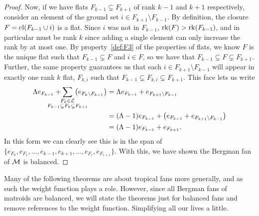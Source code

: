 \documentclass[12pt,oneside]{../../sfsuthesis}
\begin{document}
\begin{proof}
    Now, if we have flats \( F_{k-1} \subsetneq F_{k+1} \) of rank \( k-1 \) and \( k+1 \) respectively, consider an element of the ground set \( i \in F_{k+1} \setminus F_{k-1} \).
    By definition, the closure \( F = \operatorname{cl}(F_{k-1} \cup i) \) is a flat.
    Since \( i \) was not in \( F_{k-1} \), \( \operatorname{rk}(F) > \operatorname{rk}(F_{k-1}) \), and in particular must be rank \( k \) since adding a single element can only increase the rank by at most one.
    By property~\ref{def:F3} of the properties of flats, we know \( F \) is the unique flat such that \( F_{k-1} \subsetneq F \) and \( i \in F \), so we have that \( F_{k-1} \subsetneq F \subsetneq F_{k+1} \).
    Further, the same property guarantees us that each \( i \in F_{k+1} \setminus F_{k-1} \) will appear in exactly one rank \( k \) flat, \( F_{k,i} \) such that \( F_{k-1} \subsetneq F_{k,i} \subsetneq F_{k+1} \).
    This face lets us write
    \begin{align*}
        \Lambda e_{F_{k-1}} + \sum_{\mathclap{\substack{F_k \in \cL                                 \\ F_{k-1} \subsetneq F_k \subsetneq F_{k+1} }}}\, \left( e_{F_k \setminus F_{k-1}} \right)
         & = \Lambda e_{F_{k-1}} + e_{F_{k+1} \setminus F_{k-1}}                                    \\
         & = (\Lambda - 1) e_{F_{k-1}} + \left( e_{F_{k-1}} + e_{F_{k+1} \setminus F_{k-1}} \right) \\
         & = (\Lambda - 1) e_{F_{k-1}} + e_{F_{k+1}}.
    \end{align*}
    In this form we can clearly see this is in the span of \( \{ e_{F_0}, e_{F_1}, \dots, e_{k-1}, e_{k+1}, \dots, e_{F_r}, e_{F_{r+1}} \} \).
    With this, we have shown the Bergman fan of \( \mathcal{M} \) is balanced.
\end{proof}
Many of the following theorems are about tropical fans more generally, and as such the weight function plays a role.
However, since all Bergman fans of matroids are balanced, we will state the theorems just for balanced fans and remove references to the weight function.
Simplifying all our lives a little.

\end{document}
